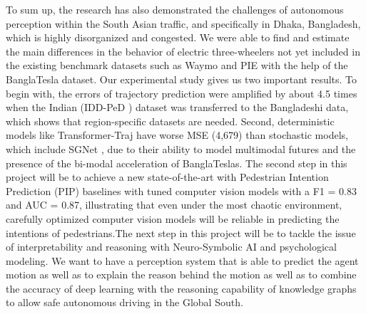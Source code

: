 \documentclass[12pt, a4paper]{article}
\begin{document}
To sum up, the research has also demonstrated the challenges of autonomous perception within the South Asian traffic, and specifically in Dhaka, Bangladesh, which is highly disorganized and congested. We were able to find and estimate the main differences in the behavior of electric three-wheelers not yet included in the existing benchmark datasets such as Waymo \cite{sun2020scalability} and PIE \cite{rasouli2019pie} with the help of the BanglaTesla dataset. Our experimental study gives us two important results. To begin with, the errors of trajectory prediction were amplified by about 4.5 times when the Indian (IDD-PeD \cite{bokkasam2025pedestrian} ) dataset was transferred to the Bangladeshi data, which shows that region-specific datasets are needed. Second, deterministic models like Transformer-Traj \cite{giuliari2021transformer} have worse MSE (4,679) than stochastic models, which include SGNet \cite{wang2022stepwise}, due to their ability to model multimodal futures and the presence of the bi-modal acceleration of BanglaTeslas. The second step in this project will be to achieve a new state-of-the-art with Pedestrian Intention Prediction (PIP) baselines with tuned computer vision models with a F1 = 0.83 and AUC = 0.87, illustrating that even under the most chaotic environment, carefully optimized computer vision models will be reliable in predicting the intentions of pedestrians.The next step in this project will be to tackle the issue of interpretability and reasoning with Neuro-Symbolic AI and psychological modeling. We want to have a perception system that is able to predict the agent motion as well as to explain the reason behind the motion as well as to combine the accuracy of deep learning with the reasoning capability of knowledge graphs to allow safe autonomous driving in the Global South.
\end{document}

